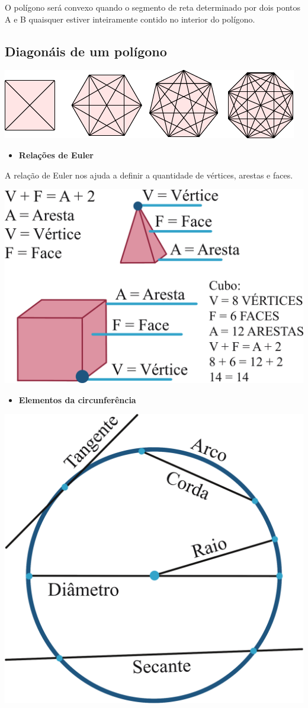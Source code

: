 {O polígono será convexo quando o segmento de reta determinado por dois pontos A e B
quaisquer estiver inteiramente contido no interior do polígono. 

\subsection{Diagonáis de um polígono}

\noindent\includegraphics[width=\textwidth]{./tikz/014.pdf}

\begin{itemize}
  \item \textbf{Relações de Euler}
\end{itemize}

A relação de Euler nos ajuda a definir a quantidade de vértices, arestas
e faces.

\includegraphics[width=\textwidth]{./ilustras-mat/modulo_10-relacoes_de_euler.png}

\begin{itemize}
  \item \textbf{Elementos da circunferência}
\end{itemize}

\includegraphics[width=.5\textwidth]{./ilustras-mat/modulo_10-elementos_da_circunferencia.png}

}
